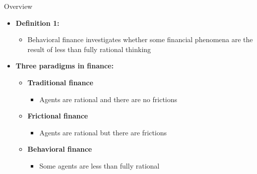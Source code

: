 \documentclass[aspectratio=169, 11pt]{beamer}
\begin{document}
\begin{frame}{Overview}
\begin{itemize}
\item \textbf{Definition 1:}
  \begin{itemize}
  \item Behavioral finance investigates whether some financial phenomena are the result of less than fully rational thinking
  \end{itemize}
\item \textbf{Three paradigms in finance:}
  \begin{itemize}
  \item \textbf{Traditional finance}
    \begin{itemize}
    \item Agents are rational and there are no frictions
    \end{itemize}
  \item \textbf{Frictional finance}
    \begin{itemize}
    \item Agents are rational but there are frictions
    \end{itemize}
  \item \textbf{Behavioral finance}
    \begin{itemize}
    \item Some agents are less than fully rational
    \end{itemize}
  \end{itemize}
\end{itemize}
\end{frame}
\end{document}
